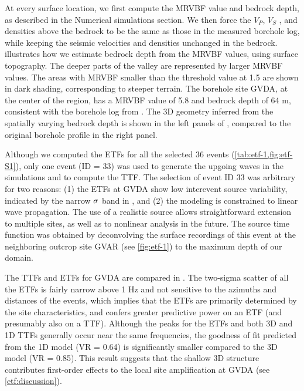 At every surface location, we first compute the MRVBF value and bedrock depth, as described in the Numerical simulations section. We then force the $V_P$, $V_S$ , and densities above the bedrock to be the same as those in the measured borehole log, while keeping the seismic velocities and densities unchanged in the bedrock.  illustrates how we estimate bedrock depth from the MRVBF values, using surface topography. The deeper parts of the valley are represented by larger MRVBF values. The areas with MRVBF smaller than the threshold value at 1.5 are shown in dark shading, corresponding to steeper terrain. The borehole site GVDA, at the center of the region, has a MRVBF value of 5.8 and bedrock depth of 64 m, consistent with the borehole log from \citet{gibbsNearsurfaceSwaveVelocities1989}. The 3D geometry inferred from the spatially varying bedrock depth is shown in the left panels of , compared to the original borehole profile in the right panel.

Although we computed the ETFs for all the selected 36 events (\cref{tab:etf-1,fig:etf-S1}), only one event (ID = 33) was used to generate the upgoing waves in the simulations and to compute the TTF. The selection of event ID 33 was arbitrary for two reasons: (1) the ETFs at GVDA show low interevent source variability, indicated by the narrow $\rm \sigma$ band in , and (2) the modeling is constrained to linear wave propagation. The use of a realistic source allows straightforward extension to multiple sites, as well as to nonlinear analysis in the future. The source time function was obtained by deconvolving the surface recordings of this event at the neighboring outcrop site GVAR (see \cref{fig:etf-1}) to the maximum depth of our domain.

The TTFs and ETFs for GVDA are compared in . The two-sigma scatter of all the ETFs is fairly narrow above 1 Hz and not sensitive to the azimuths and distances of the events, which implies that the ETFs are primarily determined by the site characteristics, and confers greater predictive power on an ETF (and presumably also on a TTF). Although the peaks for the ETFs and both 3D and 1D TTFs generally occur near the same frequencies, the goodness of fit predicted from the 1D model (VR = 0.64) is significantly smaller compared to the 3D model (VR = 0.85). This result suggests that the shallow 3D structure contributes first-order effects to the local site amplification at GVDA (see \cref{etf:discussion}).

